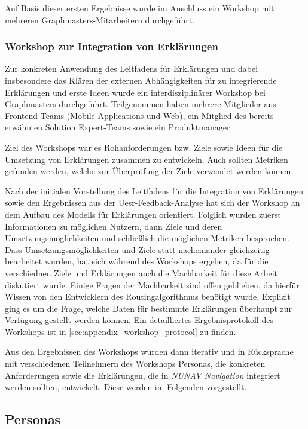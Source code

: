 Auf Basis dieser ersten Ergebnisse wurde im Anschluss ein Workshop mit mehreren Graphmasters-Mitarbeitern durchgeführt.

\newpage

\subsubsection{Workshop zur Integration von Erklärungen}

Zur konkreten Anwendung des Leitfadens für Erklärungen und dabei insbesondere das Klären der externen Abhängigkeiten für zu integrierende Erklärungen und erste Ideen wurde ein interdisziplinärer Workshop bei Graphmasters durchgeführt. Teilgenommen haben mehrere Mitglieder aus Frontend-Teams (Mobile Applications und Web), ein Mitglied des bereits erwähnten \glqq Solution Expert\grqq{}-Teams sowie ein Produktmanager. 

Ziel des Workshops war es Rohanforderungen bzw. Ziele sowie Ideen für die Umsetzung von Erklärungen zusammen zu entwickeln. Auch sollten Metriken gefunden werden, welche zur Überprüfung der Ziele verwendet werden können.

Nach der initialen Vorstellung des Leitfadens für die Integration von Erklärungen sowie den Ergebnissen aus der Uesr-Feedback-Analyse hat sich der Workshop an dem Aufbau des Modells für Erklärungen orientiert. Folglich wurden zuerst Informationen zu möglichen Nutzern, dann Ziele und deren Umsetzungsmöglichkeiten und schließlich die möglichen Metriken besprochen. Dass Umsetzungsmöglichkeiten und Ziele statt nacheinander gleichzeitig bearbeitet wurden, hat sich während des Workshops ergeben, da für die verschiednen Ziele und Erklärungen auch die Machbarkeit für diese Arbeit diskutiert wurde. Einige Fragen der Machbarkeit sind offen geblieben, da hierfür Wissen von den Entwicklern des Routingalgorithmus benötigt wurde. Explizit ging es um die Frage, welche Daten für bestimmte Erklärungen überhaupt zur Verfügung gestellt werden können. Ein detailliertes Ergebnisprotokoll des Workshops ist in \autoref{sec:appendix_workshop_protocol} zu finden.

Aus den Ergebnissen des Workshops wurden dann iterativ und in Rücksprache mit verschiedenen Teilnehmern des Workshops Personas, die konkreten Anforderungen sowie die Erklärungen, die in \textit{NUNAV Navigation} integriert werden sollten, entwickelt. Diese werden im Folgenden vorgestellt.

\subsection{Personas}
\label{sec:06_model_evaluation:personas}

